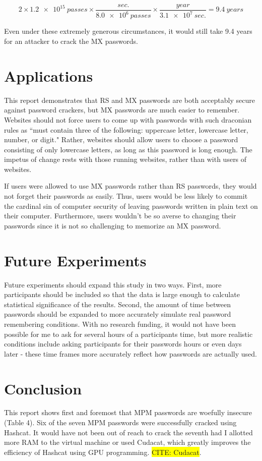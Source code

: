 \documentclass{article}
\newcommand{\hl}[1]
{\colorbox{yellow}{#1}}
\begin{document}
$$2 \times \num{1.2e15}~passes \times \frac{sec.}{\num{8.0e6}~passes} \times \frac{year}{\num{3.1e7}~sec.} = 9.4~years$$

Even under these extremely generous circumstances, it would still take 9.4 years for an attacker to crack the MX passwords.

\FloatBarrier
\section*{Applications}
This report demonstrates that RS and MX passwords are both acceptably secure against password crackers, but MX passwords are much easier to remember. Websites should not force users to come up with passwords with such draconian rules as ``must contain three of the following: uppercase letter, lowercase letter, number, or digit." Rather, websites should allow users to choose a password consisting of only lowercase letters, as long as this password is long enough. The impetus of change rests with those running websites, rather than with users of websites.

If users were allowed to use MX passwords rather than RS passwords, they would not forget their passwords as easily. Thus, users would be less likely to commit the cardinal sin of computer security of leaving passwords written in plain text on their computer. Furthermore, users wouldn't be so averse to changing their passwords since it is not so challenging to memorize an MX password.

\section*{Future Experiments}
Future experiments should expand this study in two ways. First, more participants should be included so that the data is large enough to calculate statistical significance of the results. Second, the amount of time between passwords should be expanded to more accurately simulate real password remembering conditions. With no research funding, it would not have been possible for me to ask for several hours of a participants time, but more realistic conditions include asking participants for their passwords hours or even days later - these time frames more accurately reflect how passwords are actually used.

\section*{Conclusion}
This report shows first and foremost that MPM passwords are woefully insecure (Table 4). Six of the seven MPM passwords were successfully cracked using Hashcat. It would have not been out of reach to crack the seventh had I allotted more RAM to the virtual machine or used Cudacat, which greatly improves the efficiency of Hashcat using GPU programming. \hl{CITE: Cudacat}. 
\end{document}
